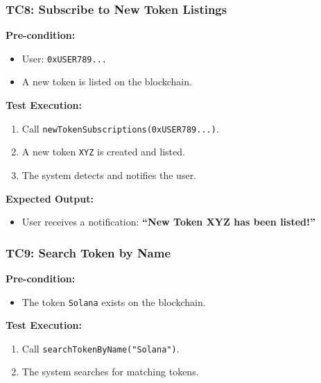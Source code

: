 \documentclass[
]{article}
\providecommand{\tightlist}{%
  \setlength{\itemsep}{0pt}\setlength{\parskip}{0pt}}
\begin{document}
\hypertarget{tc8-subscribe-to-new-token-listings}{%
\subsubsection{\texorpdfstring{\textbf{TC8: Subscribe to New Token
Listings}}{TC8: Subscribe to New Token Listings}}\label{tc8-subscribe-to-new-token-listings}}

\textbf{Pre-condition:}

\begin{itemize}
\tightlist
\item
  User: \texttt{0xUSER789...}
\item
  A new token is listed on the blockchain.
\end{itemize}

\textbf{Test Execution:}

\begin{enumerate}
\def\labelenumi{\arabic{enumi}.}
\tightlist
\item
  Call \texttt{newTokenSubscriptions(0xUSER789...)}.
\item
  A new token \texttt{XYZ} is created and listed.
\item
  The system detects and notifies the user.
\end{enumerate}

\textbf{Expected Output:}

\begin{itemize}
\tightlist
\item
  User receives a notification: \textbf{``New Token XYZ has been
  listed!''}
\end{itemize}

\hypertarget{tc9-search-token-by-name}{%
\subsubsection{\texorpdfstring{\textbf{TC9: Search Token by
Name}}{TC9: Search Token by Name}}\label{tc9-search-token-by-name}}

\textbf{Pre-condition:}

\begin{itemize}
\tightlist
\item
  The token \texttt{Solana} exists on the blockchain.
\end{itemize}

\textbf{Test Execution:}

\begin{enumerate}
\def\labelenumi{\arabic{enumi}.}
\tightlist
\item
  Call \texttt{searchTokenByName("Solana")}.
\item
  The system searches for matching tokens.
\end{enumerate}
\end{document}

